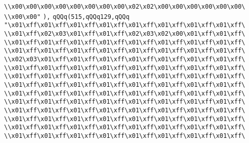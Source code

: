 \verb|\\x00\x00\x00\x00\x00\x00\x00\x00\x02\x02\x00\x00\x00\x00\x00\x00\|\newline
\verb|\\x00\x00"|\newline
\verb|),|\newline
\verb|qQQq(515,qQQq129,qQQq|\newline
\verb|"\x01\xff\x01\xff\x01\xff\x01\xff\x01\xff\x01\xff\x01\xff\x01\xff\|\newline
\verb|\\x01\xff\x02\x03\x01\xff\x01\xff\x02\x03\x02\x00\x01\xff\x01\xff\|\newline
\verb|\\x01\xff\x01\xff\x01\xff\x01\xff\x01\xff\x01\xff\x01\xff\x01\xff\|\newline
\verb|\\x01\xff\x01\xff\x01\xff\x01\xff\x01\xff\x01\xff\x01\xff\x01\xff\|\newline
\verb|\\x02\x03\x01\xff\x01\xff\x01\xff\x01\xff\x01\xff\x01\xff\x01\xff\|\newline
\verb|\\x01\xff\x01\xff\x01\xff\x01\xff\x01\xff\x01\xff\x01\xff\x01\xff\|\newline
\verb|\\x01\xff\x01\xff\x01\xff\x01\xff\x01\xff\x01\xff\x01\xff\x01\xff\|\newline
\verb|\\x01\xff\x01\xff\x01\xff\x01\xff\x01\xff\x01\xff\x01\xff\x01\xff\|\newline
\verb|\\x01\xff\x01\xff\x01\xff\x01\xff\x01\xff\x01\xff\x01\xff\x01\xff\|\newline
\verb|\\x01\xff\x01\xff\x01\xff\x01\xff\x01\xff\x01\xff\x01\xff\x01\xff\|\newline
\verb|\\x01\xff\x01\xff\x01\xff\x01\xff\x01\xff\x01\xff\x01\xff\x01\xff\|\newline
\verb|\\x01\xff\x01\xff\x01\xff\x01\xff\x01\xff\x01\xff\x01\xff\x01\xff\|\newline
\verb|\\x01\xff\x01\xff\x01\xff\x01\xff\x01\xff\x01\xff\x01\xff\x01\xff\|\newline
\verb|\\x01\xff\x01\xff\x01\xff\x01\xff\x01\xff\x01\xff\x01\xff\x01\xff\|\newline
